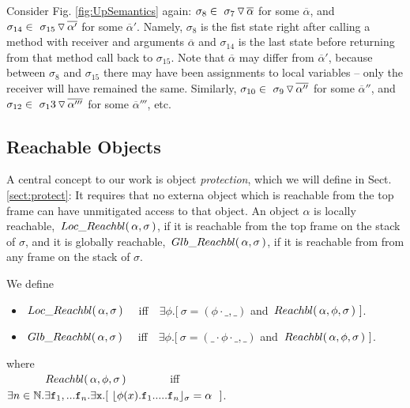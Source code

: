  

 {Consider Fig. \ref{fig:UpSemantics} again: $\sigma_8\in   \PushS  {\alpha} {\sigma_7}$ for some $\overline \alpha$, and 
 $\sigma_{14}\in\PushS  {\alpha'} {\sigma_{15}}$ for some $\overline \alpha'$. Namely, $\sigma_8$ is the fist state right after calling a method with receiver and
 arguments $\overline \alpha$ and $\sigma_{14}$ is the last state before returning from that method call back to $\sigma_{15}$.
Note that $\overline \alpha$ may differ from $\overline \alpha'$, because between $\sigma_8$ and $\sigma_{15}$ there may 
have been assignments to local variables -- only the receiver will have remained the same.
Similarly, 
 $\sigma_{10}\in\PushS  {\alpha''} {\sigma_9}$ for some $\overline \alpha''$, and  $\sigma_{12}\in\PushS  {\alpha'''} {\sigma_13}$ for some $\overline \alpha'''$, etc.
}


  \subsection{{Reachable  Objects}}

 {A central concept to our work is object \emph{protection}, which we will define in   Sect. \ref{sect:protect}: It requires that no externa object which is 
reachable from the top frame  can have unmitigated access to that object.}
%
%
An object $\alpha$ is  locally reachable, $ \LRelevant \alpha \sigma $, if it is reachable from the top frame on the stack of $\sigma$,
and it is globally reachable, $\GRelevant \alpha \sigma$, if it is reachable from from any  frame on the stack of $\sigma$.
 
\begin{definition} We define 
\begin{itemize}
\item
$ \LRelevant \alpha \sigma $ \ \ iff\ \  
$\exists \phi.[\ \sigma=(\phi\cdot\_, \_)$ and $\Relevant \alpha \phi \sigma\ ]$. %
\item
$\GRelevant \alpha \sigma$  \ \ iff\ \  
$\exists \phi.[\ \sigma=(\_\cdot\phi\cdot\_, \_)$ and $\Relevant \alpha \phi \sigma\ ]$. %
\end{itemize}
where\\
$\strut\ \ \ \  \ \ \ \ \ \ \Relevant \alpha \phi \sigma $  \ \ \ \ \ \ \ iff\ \  
$\exists n\in \mathbb{N}.\exists \prg{f}_1,... \prg{f}_n.\exists \prg{x}.[ \ \interpret{\sigma}{\phi(x).\prg{f}_1.....\prg{f}_n} = \alpha \ \ ]$.

\end{definition}

